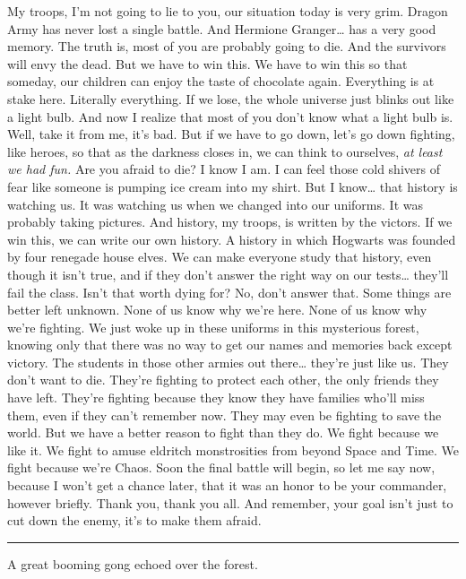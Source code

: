 My troops, I'm not going to lie to you, our situation today is very
grim. Dragon Army has never lost a single battle. And Hermione
Granger\ldots{} has a very good memory. The truth is, most of you are
probably going to die. And the survivors will envy the dead. But we have
to win this. We have to win this so that someday, our children can enjoy
the taste of chocolate again. Everything is at stake here. Literally
everything. If we lose, the whole universe just blinks out like a light
bulb. And now I realize that most of you don't know what a light bulb
is. Well, take it from me, it's bad. But if we have to go down, let's go
down fighting, like heroes, so that as the darkness closes in, we can
think to ourselves, \emph{at least we had fun.} Are you afraid to die? I
know I am. I can feel those cold shivers of fear like someone is pumping
ice cream into my shirt. But I know\ldots{} that history is watching us.
It was watching us when we changed into our uniforms. It was probably
taking pictures. And history, my troops, is written by the victors. If
we win this, we can write our own history. A history in which Hogwarts
was founded by four renegade house elves. We can make everyone study
that history, even though it isn't true, and if they don't answer the
right way on our tests\ldots{} they'll fail the class. Isn't that worth
dying for? No, don't answer that. Some things are better left unknown.
None of us know why we're here. None of us know why we're fighting. We
just woke up in these uniforms in this mysterious forest, knowing only
that there was no way to get our names and memories back except victory.
The students in those other armies out there\ldots{} they're just like
us. They don't want to die. They're fighting to protect each other, the
only friends they have left. They're fighting because they know they
have families who'll miss them, even if they can't remember now. They
may even be fighting to save the world. But we have a better reason to
fight than they do. We fight because we like it. We fight to amuse
eldritch monstrosities from beyond Space and Time. We fight because
we're Chaos. Soon the final battle will begin, so let me say now,
because I won't get a chance later, that it was an honor to be your
commander, however briefly. Thank you, thank you all. And remember, your
goal isn't just to cut down the enemy, it's to make them afraid.

\begin{center}\rule{3in}{0.4pt}\end{center}

A great booming gong echoed over the forest.

